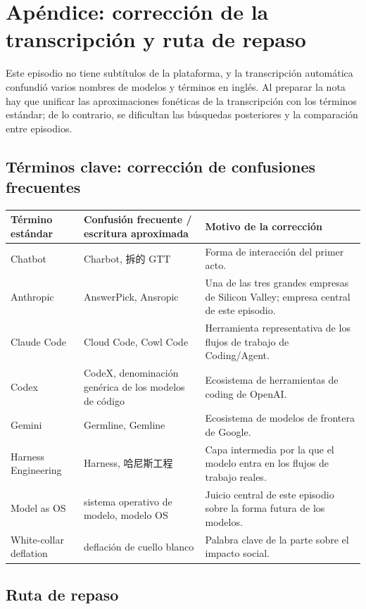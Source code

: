 \documentclass[a4paper]{article}
\begin{document}
\section{Apéndice: corrección de la transcripción y ruta de repaso}

Este episodio no tiene subtítulos de la plataforma, y la transcripción automática confundió varios nombres de modelos y términos en inglés. Al preparar la nota hay que unificar las aproximaciones fonéticas de la transcripción con los términos estándar; de lo contrario, se dificultan las búsquedas posteriores y la comparación entre episodios.

\subsection{Términos clave: corrección de confusiones frecuentes}

\noindent\begin{longtable}{p{}p{}p{}}
\toprule
Término estándar & Confusión frecuente / escritura aproximada & Motivo de la corrección \\
\midrule
Chatbot & Charbot, 拆的 GTT & Forma de interacción del primer acto. \\
Anthropic & AnswerPick, Ansropic & Una de las tres grandes empresas de Silicon Valley; empresa central de este episodio. \\
Claude Code & Cloud Code, Cowl Code & Herramienta representativa de los flujos de trabajo de Coding/Agent. \\
Codex & CodeX, denominación genérica de los modelos de código & Ecosistema de herramientas de coding de OpenAI. \\
Gemini & Germline, Gemline & Ecosistema de modelos de frontera de Google. \\
Harness Engineering & Harness, 哈尼斯工程 & Capa intermedia por la que el modelo entra en los flujos de trabajo reales. \\
Model as OS & sistema operativo de modelo, modelo OS & Juicio central de este episodio sobre la forma futura de los modelos. \\
White-collar deflation & deflación de cuello blanco & Palabra clave de la parte sobre el impacto social. \\
\bottomrule
\end{longtable}

\subsection{Ruta de repaso}
\end{document}
